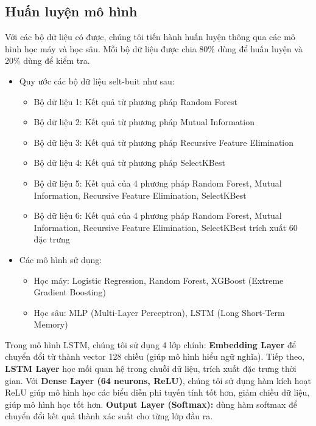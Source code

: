 \documentclass[13pt]{article}
\begin{document}
\subsection{Huấn luyện mô hình}
Với các bộ dữ liệu có được, chúng tôi tiến hành huấn luyện thông qua các mô hình học máy và học sâu. Mỗi bộ dữ liệu được chia 80\% dùng để huấn luyện và 20\% dùng để kiểm tra.
\begin{itemize}
    \item Quy ước các bộ dữ liệu selt-buit như sau:
    \begin{itemize}
        \item Bộ dữ liệu 1: Kết quả từ phương pháp Random Forest
        \item Bộ dữ liệu 2: Kết quả từ phương pháp Mutual Information
        \item Bộ dữ liệu 3: Kết quả từ phương pháp Recursive Feature Elimination
        \item Bộ dữ liệu 4: Kết quả từ phương pháp SelectKBest
        \item Bộ dữ liệu 5: Kết quả của 4 phương pháp Random Forest, Mutual Information, Recursive Feature Elimination, SelectKBest
        \item Bộ dữ liệu 6: Kết quả của 4 phương pháp Random Forest, Mutual Information, Recursive Feature Elimination, SelectKBest trích xuất 60 đặc trưng
    \end{itemize}
    \item Các mô hình sử dụng:
    \begin{itemize}
        \item Học máy: Logistic Regression, Random Forest, XGBoost (Extreme Gradient Boosting)
        \item Học sâu: MLP (Multi-Layer Perceptron), LSTM (Long Short-Term Memory)
    \end{itemize}
\end{itemize}

Trong mô hình LSTM, chúng tôi sử dụng 4 lớp chính: \textbf{Embedding Layer} để chuyển đổi từ thành vector 128 chiều (giúp mô hình hiểu ngữ nghĩa). Tiếp theo, \textbf{LSTM Layer} học mối quan hệ trong chuỗi dữ liệu, trích xuất đặc trưng thời gian. Với \textbf{Dense Layer (64 neurons, ReLU)}, chúng tôi sử dụng hàm kích hoạt ReLU giúp mô hình học các biểu diễn phi tuyến tính tốt hơn, giảm chiều dữ liệu, giúp mô hình học tốt hơn. \textbf{Output Layer (Softmax):} dùng hàm softmax để chuyển đổi kết quả thành xác suất cho từng lớp đầu ra.
\end{document}
